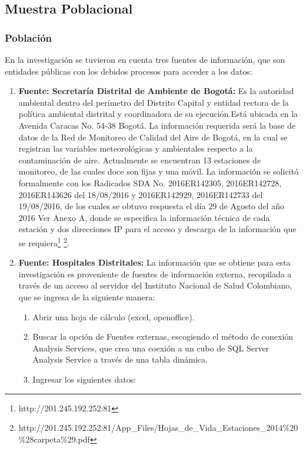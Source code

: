 \documentclass[a4paper,openright,12pt]{book}
\theoremstyle{definition}
\theoremstyle{remark}
\begin{document}
	\subsection{Muestra Poblacional}
    	\subsubsection{Población}
        En la investigación se tuvieron en cuenta tres fuentes de información, que son entidades públicas con los debidos procesos para acceder a los datos:\\

\begin{enumerate}
	\item \textbf{Fuente: Secretaría Distrital de Ambiente de Bogotá:} Es la autoridad ambiental dentro del perímetro del Distrito Capital y entidad rectora de la política ambiental distrital y coordinadora de su ejecución.Está ubicada en la Avenida Caracas No. 54-38 Bogotá. La información requerida será la base de datos de la Red de Monitoreo de Calidad del Aire de Bogotá, en la cual se registran las variables meteorológicas y ambientales respecto a la contaminación de aire. Actualmente se encuentran 13 estaciones de monitoreo, de las cuales doce son fijas y una móvil. La información se solicitó formalmente con los Radicados SDA No. 2016ER142305, 2016ER142728, 2016ER143626 del 18/08/2016 y 2016ER142929, 2016ER142733 del 19/08/2016, de los cuales  se obtuvo respuesta el día 29 de Agosto del año 2016 Ver Anexo A, donde se especifica la información técnica de cada estación y dos direcciones IP para el acceso y descarga de la información que se requiera\footnote{http://201.245.192.252:81} \footnote{http://201.245.192.252:81/App\_Files/Hojas\_de\_Vida\_Estaciones\_2014\%20\%28carpeta\%29.pdf}.
    \item \textbf{Fuente: Hospitales Distritales:}
La información  que se  obtiene para esta investigación es proveniente de fuentes de información externa, recopilada a través de un acceso al servidor del Instituto Nacional de Salud Colombiano, que se ingresa de la siguiente manera:
    \begin{enumerate}
		\item Abrir una hoja de cálculo (excel, openoffice).
        \item Buscar la opción de Fuentes externas, escogiendo el método de conexión Analysis Services, que crea una coexión a un cubo de SQL Server Analysis Service a través de una tabla dinámica.
        \item Ingresar los siguientes datos:

\end{enumerate}
\end{enumerate}
\end{document}
